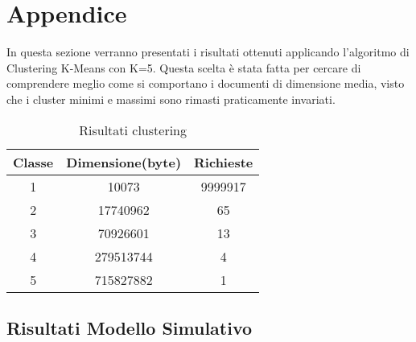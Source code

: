\chapter{Appendice}\label{appendice}
In questa sezione verranno presentati i risultati ottenuti applicando l'algoritmo di Clustering K-Means con K=5. Questa scelta è stata fatta per cercare di comprendere meglio come si comportano i documenti di dimensione media, visto che i cluster minimi e massimi sono rimasti praticamente invariati. 
\begin{table}[H]
\begin{center}
\begin{tabular}{||c|c|c||}
\hline
Classe	&Dimensione(byte)		&Richieste \\ 
\hline\hline
1 &10073 &9999917\\ \hline 
2 &17740962 &65 \\ \hline 
3 &70926601 &13 \\ \hline 
4 &279513744 &4 \\ \hline 
5 &715827882 &1 \\ \hline
\end{tabular}
\end{center}
\caption{Risultati clustering}
\label{risclustering}
\end{table}
\section{Risultati Modello Simulativo}
